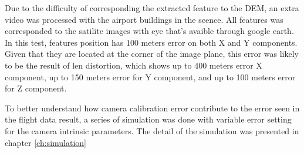 Due to the difficulty of corresponding the extracted feature to the
DEM, an extra video was processed with the airport buildings in the
scence. All features was corresponded to the satilite images with eye
that's avaible through google earth. In this test, features position
has 100 meters error on both X and Y components. Given that they are
located at the corner of the image plane, this error was likely to be
the result of len distortion, which shows up to 400 meters error X
component, up to 150 meters error for Y component, and up to 100
meters error for Z component. 

To better understand how camera calibration error contribute to the
error seen in the flight data result, a series of simulation was done
with variable error setting for the camera intrinsic parameters. The
detail of the simulation was presented in chapter \ref{ch:simulation}

